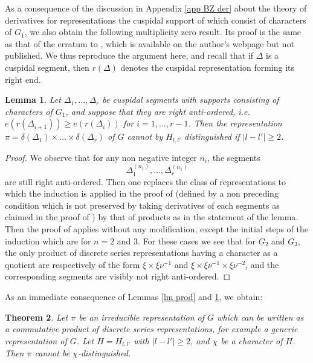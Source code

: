 \documentclass[11pt,letterpaper]{amsart}
\def\D{\Delta}
\def\d{\delta}
\theoremstyle{plain}
\newtheorem{thm}{Theorem}[section] \newtheorem{cor}[thm]{Corollary}
\newtheorem{lem}[thm]{Lemma}  \newtheorem{prop}[thm]{Proposition}
\numberwithin{equation}{section}
\begin{document}
As a consequence of the discussion in Appendix \ref{app BZ der} about the theory of derivatives for representations the cuspidal support of which consist of characters of $G_1$, we also obtain the following multiplicity zero result. Its proof is the same as that of the erratum to \cite[Theorem 3.2]{MatJNT}, which is available on the author's webpage but not published. We thus reproduce the argument here, and recall that if $\Delta$ is a cuspidal segment, then $r(\Delta)$ denotes the cuspidal representation forming its right end. 

\begin{lem}\label{lm anti}
Let $\D_1,\dots,\D_r$ be cuspidal segments with supports consisting of characters of $G_1$, and suppose that they are right anti-ordered, i.e. $e(r(\D_{i+1}))\geq e(r(\D_i))$ for $i=1,\dots, r-1$. Then the representation $\pi=\d(\D_1)\times \dots \times \d(\D_r)$ of $G$ cannot by $H_{l,l'}$ distinguished if $|l-l'|\geq 2$. 
\end{lem}
\begin{proof}
We observe that for any non negative integer $n_i$, the segments \[\D_1^{(n_1)},\dots,\D_r^{(n_1)}\] are still right anti-ordered. Then one replaces the class of representations to which the induction is applied in the proof of \cite[Theorem 3.2]{MatJNT} (defined by a non preceding condition which is not preserved by taking derivatives of each segments as claimed in the proof of \cite[Theorem 3.2]{MatJNT}) by that of products as in the statement of the lemma. Then the proof of \cite[Theorem 3.2]{MatJNT} applies without any modification, except the initial steps of the induction which are for $n=2$ and $3$. For these cases we see that for $G_2$ and $G_3$, the only product of discrete series representations having a character as a quotient are respectively of the form $\xi\times \xi \nu^{-1}$ and $\xi\times \xi \nu^{-1}\times \xi \nu^{-2}$, and the corresponding segments are visibly not right anti-ordered.
\end{proof}

As an immediate consequence of Lemmas \ref{lm prod} and \ref{lm anti}, we obtain:

\begin{thm}\label{thm mult 0}
Let $\pi$ be an irreducible representation of $G$ which can be written as a commutative product of discrete series representations, for example a generic representation of $G$. Let $H=H_{l,l'}$ with $|l-l'|\geq 2$, and $\chi$ be a character of $H$. Then $\pi$ cannot be $\chi$-distinguished. 
\end{thm}
\end{document}

